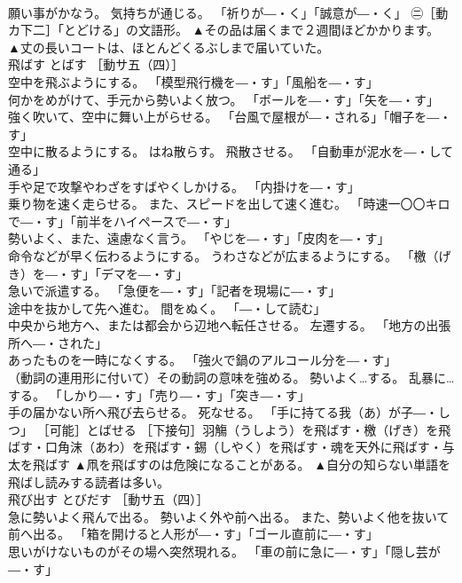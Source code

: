 \documentclass[8pt]{extreport}
\begin{document}
\begin{CJK}{UTF8}{min}
\\	願い事がかなう。 気持ちが通じる。 「祈りが―・く」「誠意が―・く」 ㊁［動カ下二］「とどける」の文語形。	▲その品は届くまで２週間ほどかかります。 ▲丈の長いコートは、ほとんどくるぶしまで届いていた。
\\	飛ばす	とばす	［動サ五（四）］ 
\\	空中を飛ぶようにする。 「模型飛行機を―・す」「風船を―・す」 
\\	何かをめがけて、手元から勢いよく放つ。 「ボールを―・す」「矢を―・す」 
\\	強く吹いて、空中に舞い上がらせる。 「台風で屋根が―・される」「帽子を―・す」 
\\	空中に散るようにする。 はね散らす。 飛散させる。 「自動車が泥水を―・して通る」 
\\	手や足で攻撃やわざをすばやくしかける。 「内掛けを―・す」 
\\	乗り物を速く走らせる。 また、スピードを出して速く進む。 「時速一〇〇キロで―・す」「前半をハイペースで―・す」 
\\	勢いよく、また、遠慮なく言う。 「やじを―・す」「皮肉を―・す」 
\\	命令などが早く伝わるようにする。 うわさなどが広まるようにする。 「檄（げき）を―・す」「デマを―・す」 
\\	急いで派遣する。 「急便を―・す」「記者を現場に―・す」 
\\	途中を抜かして先へ進む。 間をぬく。 「―・して読む」 
\\	中央から地方へ、または都会から辺地へ転任させる。 左遷する。 「地方の出張所へ―・された」 
\\	あったものを一時になくする。 「強火で鍋のアルコール分を―・す」 
\\	（動詞の連用形に付いて）その動詞の意味を強める。 勢いよく…する。 乱暴に…する。 「しかり―・す」「売り―・す」「突き―・す」 
\\	手の届かない所へ飛び去らせる。 死なせる。 「手に持てる我（あ）が子―・しつ」 ［可能］とばせる ［下接句］羽觴（うしよう）を飛ばす・檄（げき）を飛ばす・口角沫（あわ）を飛ばす・錫（しやく）を飛ばす・魂を天外に飛ばす・与太を飛ばす	▲凧を飛ばすのは危険になることがある。 ▲自分の知らない単語を飛ばし読みする読者は多い。
\\	飛び出す	とびだす	［動サ五（四）］ 
\\	急に勢いよく飛んで出る。 勢いよく外や前へ出る。 また、勢いよく他を抜いて前へ出る。 「箱を開けると人形が―・す」「ゴール直前に―・す」 
\\	思いがけないものがその場へ突然現れる。 「車の前に急に―・す」「隠し芸が―・す」 

\end{CJK}
\end{document}
